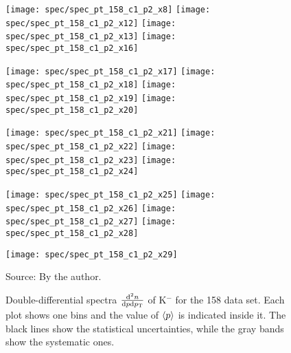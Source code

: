 \begin{figure}[!ht]
  \centering

  \texttt{[image: spec/spec\_pt\_158\_c1\_p2\_x8]}
  \texttt{[image: spec/spec\_pt\_158\_c1\_p2\_x12]}
  \texttt{[image: spec/spec\_pt\_158\_c1\_p2\_x13]}
  \texttt{[image: spec/spec\_pt\_158\_c1\_p2\_x16]}
  
  \texttt{[image: spec/spec\_pt\_158\_c1\_p2\_x17]}
  \texttt{[image: spec/spec\_pt\_158\_c1\_p2\_x18]}
  \texttt{[image: spec/spec\_pt\_158\_c1\_p2\_x19]}
  \texttt{[image: spec/spec\_pt\_158\_c1\_p2\_x20]}

  \texttt{[image: spec/spec\_pt\_158\_c1\_p2\_x21]}
  \texttt{[image: spec/spec\_pt\_158\_c1\_p2\_x22]}
  \texttt{[image: spec/spec\_pt\_158\_c1\_p2\_x23]}
  \texttt{[image: spec/spec\_pt\_158\_c1\_p2\_x24]}

  \texttt{[image: spec/spec\_pt\_158\_c1\_p2\_x25]}
  \texttt{[image: spec/spec\_pt\_158\_c1\_p2\_x26]}
  \texttt{[image: spec/spec\_pt\_158\_c1\_p2\_x27]}
  \texttt{[image: spec/spec\_pt\_158\_c1\_p2\_x28]}

  \texttt{[image: spec/spec\_pt\_158\_c1\_p2\_x29]}

  \caption{Double-differential spectra $\frac{\text{d}^2n}{\text{d}p\text{d}p_\text{T}}$
    of K$^-$ for the 158 \GeVc data set. Each plot shows one \pp bins and the value
    of $\langle p\rangle$ is indicated inside it. The black lines show the statistical
    uncertainties, while the gray bands show the systematic ones.}
  \label{fig:hadron:spec:dedx:all158:c1p2}
  \begin{center}
    \small Source: By the author. 
  \end{center}
\end{figure}

